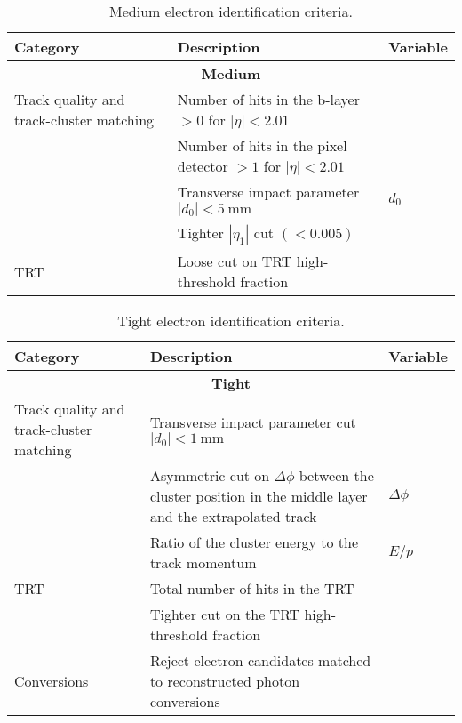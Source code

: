 \begin{table}[hbtp]
  \centering
  \begin{tabular}{@{}p{}p{}l@{}}
    \toprule
    Category & Description & Variable \\
    \midrule
    \multicolumn{3}{c}{\textbf{Medium}} \\
    Track quality and track-cluster matching & Number of hits in the b-layer $>0$ for $|\eta|<2.01$ \\
    & Number of hits in the pixel detector $>1$ for $|\eta|<2.01$ \\
    & Transverse impact parameter $|d_0|<\SI{5}{\mm}$ & $d_{0}$ \\
    & Tighter $|\eta_{1}|$ cut $(<0.005)$ \\
    TRT & Loose cut on TRT high-threshold fraction \\
    \bottomrule
  \end{tabular}
  \caption{Medium electron identification criteria.}
  \label{tab:DetectorAppElectronMedium}
\end{table}

\begin{table}[hbtp]
  \centering
    \begin{tabular}{@{}p{}p{}l@{}}
      \toprule
      Category & Description & Variable \\
      \midrule
      \multicolumn{3}{c}{\textbf{Tight}} \\ 
      Track quality and track-cluster matching & Transverse impact parameter cut $|d_0|<\SI{1}{\mm}$ \\ 
      & Asymmetric cut on $\Delta\phi$ between the cluster position in the middle layer and the extrapolated track & $\Delta\phi$ \\
      & Ratio of the cluster energy to the track momentum & $E/p$ \\
      TRT & Total number of hits in the TRT \\
      & Tighter cut on the TRT high-threshold fraction \\
      Conversions & Reject electron candidates matched to reconstructed photon conversions \\
      \bottomrule
    \end{tabular}
    \caption{Tight electron identification criteria.}
  \label{tab:DetectorAppElectronTight}
\end{table}
